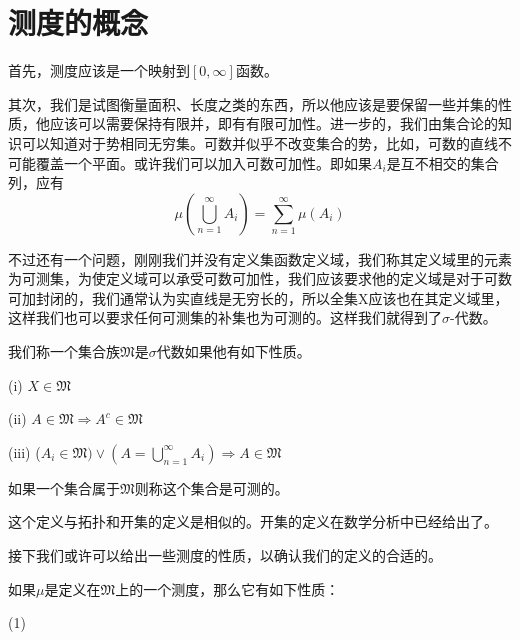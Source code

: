 \section{测度的概念}
首先，测度应该是一个映射到$[0,\infty]$函数。
\par
其次，我们是试图衡量面积、长度之类的东西，所以他应该是要保留一些并集的性质，他应该可以需要保持有限并，即有有限可加性。进一步的，我们由集合论的知识可以知道对于势相同无穷集。可数并似乎不改变集合的势，比如，可数的直线不可能覆盖一个平面。或许我们可以加入可数可加性。即如果$A_{i}$是互不相交的集合列，应有
$$\mu (\bigcup_{n = 1}^{\infty}A_{i})=\sum_{n = 1}^{\infty} \mu(A_{i})$$
\par 
不过还有一个问题，刚刚我们并没有定义集函数定义域，我们称其定义域里的元素为可测集，为使定义域可以承受可数可加性，我们应该要求他的定义域是对于可数可加封闭的，我们通常认为实直线是无穷长的，所以全集X应该也在其定义域里，这样我们也可以要求任何可测集的补集也为可测的。这样我们就得到了$\sigma$-代数。
\begin{definition}
    我们称一个集合族$\mathfrak{M}$是$\sigma$代数如果他有如下性质。
    \par
    (i)   $X\in \mathfrak{M} $
    \par 
    (ii)  $A\in \mathfrak{M}\Rightarrow A^{c}\in \mathfrak{M}$
    \par 
    (iii) ($A_{i}\in \mathfrak{M})\vee(A = \bigcup_{n = 1}^{\infty}A_{i})\Rightarrow A\in \mathfrak{M} $
    \par
    如果一个集合属于$\mathfrak{M}$则称这个集合是可测的。
\end{definition}
这个定义与拓扑和开集的定义是相似的。开集的定义在数学分析中已经给出了。
\par 
接下我们或许可以给出一些测度的性质，以确认我们的定义的合适的。
\begin{proposition}
    如果$\mu$是定义在$\mathfrak{M}$上的一个测度，那么它有如下性质：
    \par 
    (1)
\end{proposition}